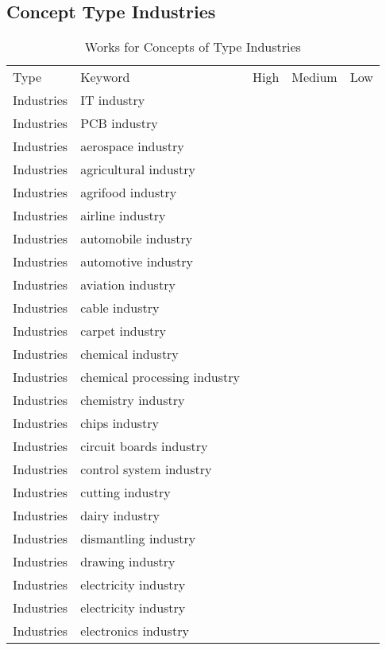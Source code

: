 \clearpage
\subsection{Concept Type Industries}
\label{sec:Industries}
{\scriptsize
\begin{longtable}{lp{3cm}>{\raggedright\arraybackslash}p{6cm}>{\raggedright\arraybackslash}p{6cm}>{\raggedright\arraybackslash}p{8cm}}
\rowcolor{white}\caption{Works for Concepts of Type Industries}\\ \toprule
\rowcolor{white}Type & Keyword & High & Medium & Low\\ \midrule\endhead
\bottomrule
\endfoot
Industries & IT industry &  &  & \\
Industries & PCB industry &  &  & \\
Industries & aerospace industry &  &  & \\
Industries & agricultural industry &  &  & \\
Industries & agrifood industry &  &  & \\
Industries & airline industry &  &  & \\
Industries & automobile industry &  &  & \\
Industries & automotive industry &  &  & \\
Industries & aviation industry &  &  & \\
Industries & cable industry &  &  & \\
Industries & carpet industry &  &  & \\
Industries & chemical industry &  &  & \\
Industries & chemical processing industry &  &  & \\
Industries & chemistry industry &  &  & \\
Industries & chips industry &  &  & \\
Industries & circuit boards industry &  &  & \\
Industries & control system industry &  &  & \\
Industries & cutting industry &  &  & \\
Industries & dairy industry &  &  & \\
Industries & dismantling industry &  &  & \\
Industries & drawing industry &  &  & \\
Industries & electricity industry &  &  & \\
Industries & electricity industry &  &  & \\
Industries & electronics industry &  &  & \\

\end{longtable}}
